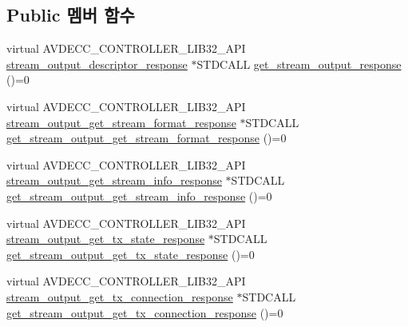 \subsection*{Public 멤버 함수}
\begin{DoxyCompactItemize}
\item 
virtual A\+V\+D\+E\+C\+C\+\_\+\+C\+O\+N\+T\+R\+O\+L\+L\+E\+R\+\_\+\+L\+I\+B32\+\_\+\+A\+PI \hyperlink{classavdecc__lib_1_1stream__output__descriptor__response}{stream\+\_\+output\+\_\+descriptor\+\_\+response} $\ast$S\+T\+D\+C\+A\+LL \hyperlink{classavdecc__lib_1_1stream__output__descriptor_af92b70610c451a7f1eefcb71b3d97eb8}{get\+\_\+stream\+\_\+output\+\_\+response} ()=0
\item 
virtual A\+V\+D\+E\+C\+C\+\_\+\+C\+O\+N\+T\+R\+O\+L\+L\+E\+R\+\_\+\+L\+I\+B32\+\_\+\+A\+PI \hyperlink{classavdecc__lib_1_1stream__output__get__stream__format__response}{stream\+\_\+output\+\_\+get\+\_\+stream\+\_\+format\+\_\+response} $\ast$S\+T\+D\+C\+A\+LL \hyperlink{classavdecc__lib_1_1stream__output__descriptor_a98069d42fe39ffe5f82626232fb99006}{get\+\_\+stream\+\_\+output\+\_\+get\+\_\+stream\+\_\+format\+\_\+response} ()=0
\item 
virtual A\+V\+D\+E\+C\+C\+\_\+\+C\+O\+N\+T\+R\+O\+L\+L\+E\+R\+\_\+\+L\+I\+B32\+\_\+\+A\+PI \hyperlink{classavdecc__lib_1_1stream__output__get__stream__info__response}{stream\+\_\+output\+\_\+get\+\_\+stream\+\_\+info\+\_\+response} $\ast$S\+T\+D\+C\+A\+LL \hyperlink{classavdecc__lib_1_1stream__output__descriptor_a7fec6aaa05428f91d87c020e6fb44d22}{get\+\_\+stream\+\_\+output\+\_\+get\+\_\+stream\+\_\+info\+\_\+response} ()=0
\item 
virtual A\+V\+D\+E\+C\+C\+\_\+\+C\+O\+N\+T\+R\+O\+L\+L\+E\+R\+\_\+\+L\+I\+B32\+\_\+\+A\+PI \hyperlink{classavdecc__lib_1_1stream__output__get__tx__state__response}{stream\+\_\+output\+\_\+get\+\_\+tx\+\_\+state\+\_\+response} $\ast$S\+T\+D\+C\+A\+LL \hyperlink{classavdecc__lib_1_1stream__output__descriptor_ad352ecf636c3497e245f402b2a369f51}{get\+\_\+stream\+\_\+output\+\_\+get\+\_\+tx\+\_\+state\+\_\+response} ()=0
\item 
virtual A\+V\+D\+E\+C\+C\+\_\+\+C\+O\+N\+T\+R\+O\+L\+L\+E\+R\+\_\+\+L\+I\+B32\+\_\+\+A\+PI \hyperlink{classavdecc__lib_1_1stream__output__get__tx__connection__response}{stream\+\_\+output\+\_\+get\+\_\+tx\+\_\+connection\+\_\+response} $\ast$S\+T\+D\+C\+A\+LL \hyperlink{classavdecc__lib_1_1stream__output__descriptor_a802183ad18a965dc8540b3053ea875d4}{get\+\_\+stream\+\_\+output\+\_\+get\+\_\+tx\+\_\+connection\+\_\+response} ()=0
\item 

\end{DoxyCompactItemize}

